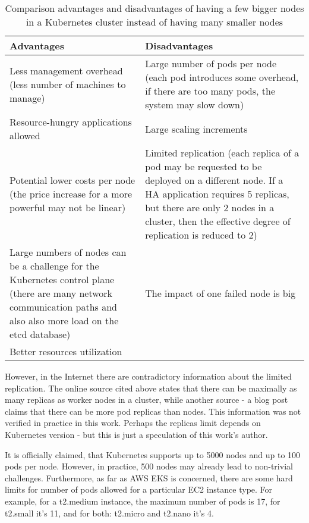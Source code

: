 \begin{table}[H]
\begin{tabularx}{1\textwidth} {
  | >{\centering\arraybackslash}X
  | >{\centering\arraybackslash}X | }
 \hline
  \textbf{Advantages} & \textbf{Disadvantages}  \\
 \hline
 Less management overhead (less number of machines to manage)  & Large number of pods per node (each pod introduces some overhead, if there are too many pods, the system may slow down)   \\
 \hline
 Resource-hungry applications allowed  & Large scaling increments  \\
 \hline
  Potential lower costs per node (the price increase for a more powerful may not be linear)  & Limited replication (each replica of a pod may be requested to be deployed on a different node. If a HA application requires 5 replicas, but there are only 2 nodes in a cluster, then the effective degree of replication is reduced to 2)  \\
 \hline
  Large numbers of nodes can be a challenge for the Kubernetes control plane (there are many network communication paths and also also more load on the etcd database) & The impact of one failed node is big   \\
 \hline
  Better resources utilization &   \\
 \hline
\end{tabularx}
\caption{\label{tab:pros-cons-large-nodes}Comparison advantages and disadvantages of having a few bigger nodes in a Kubernetes cluster instead of having many smaller nodes\cite{kubernetes-node-size}}
\end{table}

However, in the Internet there are contradictory information about the limited replication. The online source cited above\cite{kubernetes-node-size} states that there can be maximally as many replicas as worker nodes in a cluster, while another source - a blog post\cite{learnk8s-ll} claims that there can be more pod replicas than nodes. This information was not verified in practice in this work. Perhaps the replicas limit depends on Kubernetes version - but this is just a speculation of this work's author.

It is officially claimed, that Kubernetes supports up to 5000 nodes and up to 100 pods per node\cite{kubernetes-node-size}\cite{kubernetes-large}. However, in practice, 500 nodes may already lead to non-trivial challenges. Furthermore, as far as AWS EKS is concerned, there are some hard limits for number of pods allowed for a particular EC2 instance type. For example, for a t2.medium instance, the maximum number of pods is 17, for t2.small it's 11, and for both: t2.micro and t2.nano it's 4\cite{kubernetes-node-size}\cite{eks-hard-limits}.

